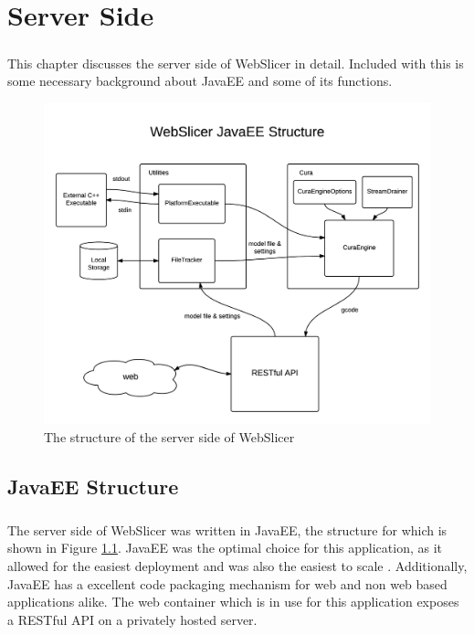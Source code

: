 \chapter{Server Side}
\paragraph{}
This chapter discusses the server side of WebSlicer in detail. 
Included with this is some necessary background about JavaEE and some of its functions.

\begin{figure}[!ht]
  \centering
  \includegraphics[width=\linewidth]{diagrams/Server-Side-Structure}
  \caption{The structure of the server side of WebSlicer}
  \label{fig:server-side-structure}
\end{figure}

\section{JavaEE Structure}
\paragraph{}
The server side of WebSlicer was written in JavaEE, the structure for which is shown in Figure \ref{fig:server-side-structure}.
JavaEE was the optimal choice for this application, as it allowed for the easiest deployment and was also the easiest to scale \citep{pilgrim-2013}.
Additionally, JavaEE has a excellent code packaging mechanism for web and non web based applications alike.
The web container which is in use for this application exposes a RESTful API on a privately hosted server.

